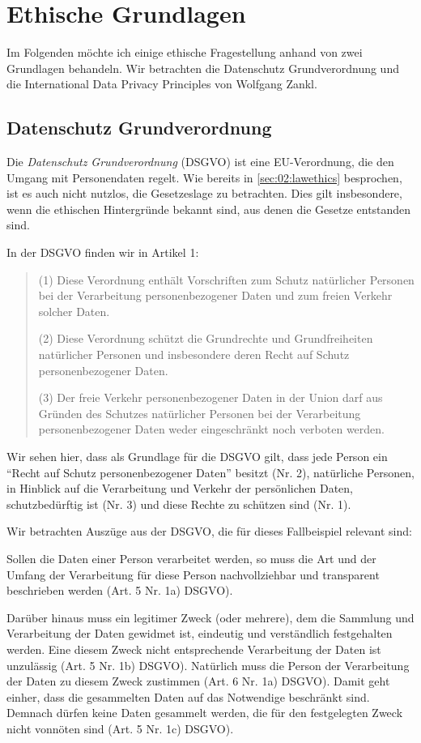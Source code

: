 \section{Ethische Grundlagen}

Im Folgenden möchte ich einige ethische Fragestellung anhand von zwei Grundlagen behandeln.
Wir betrachten die Datenschutz Grundverordnung und die International Data Privacy Principles\cite{zankl_international_2014} von Wolfgang Zankl.

\subsection{Datenschutz Grundverordnung}

Die \emph{Datenschutz Grundverordnung} (DSGVO) ist eine EU-Verordnung, die den Umgang mit Personendaten regelt.
Wie bereits in \cref{sec:02:lawethics} besprochen, ist es auch nicht nutzlos, die Gesetzeslage zu betrachten.
Dies gilt insbesondere, wenn die ethischen Hintergründe bekannt sind, aus denen die Gesetze entstanden sind.

In der DSGVO finden wir in Artikel 1:
\blockquote{
    (1) Diese Verordnung enthält Vorschriften zum Schutz natürlicher Personen bei der Verarbeitung personenbezogener Daten und zum freien Verkehr solcher Daten.

    (2) Diese Verordnung schützt die Grundrechte und Grundfreiheiten natürlicher Personen und insbesondere deren Recht auf Schutz personenbezogener Daten.

    (3) Der freie Verkehr personenbezogener Daten in der Union darf aus Gründen des Schutzes natürlicher Personen bei der Verarbeitung personenbezogener Daten weder eingeschränkt noch verboten werden.
}

Wir sehen hier, dass als Grundlage für die DSGVO gilt, dass jede Person ein \enquote{Recht auf Schutz personenbezogener Daten} besitzt (Nr. 2), 
natürliche Personen, in Hinblick auf die Verarbeitung und Verkehr der persönlichen Daten, schutzbedürftig ist (Nr. 3) und diese Rechte zu schützen sind (Nr. 1).

Wir betrachten Auszüge aus der DSGVO, die für dieses Fallbeispiel relevant sind:

Sollen die Daten einer Person verarbeitet werden, so muss die Art und der Umfang der Verarbeitung für diese Person nachvollziehbar und transparent beschrieben werden (Art. 5 Nr. 1a) DSGVO).

Darüber hinaus muss ein legitimer Zweck (oder mehrere), dem die Sammlung und Verarbeitung der Daten gewidmet ist, eindeutig und verständlich festgehalten werden. Eine diesem Zweck nicht entsprechende Verarbeitung der Daten ist unzulässig (Art. 5 Nr. 1b) DSGVO). Natürlich muss die Person der Verarbeitung der Daten zu diesem Zweck zustimmen (Art. 6 Nr. 1a) DSGVO).
Damit geht einher, dass die gesammelten Daten auf das Notwendige beschränkt sind.
Demnach dürfen keine Daten gesammelt werden, die für den festgelegten Zweck nicht vonnöten sind (Art. 5 Nr. 1c) DSGVO).

